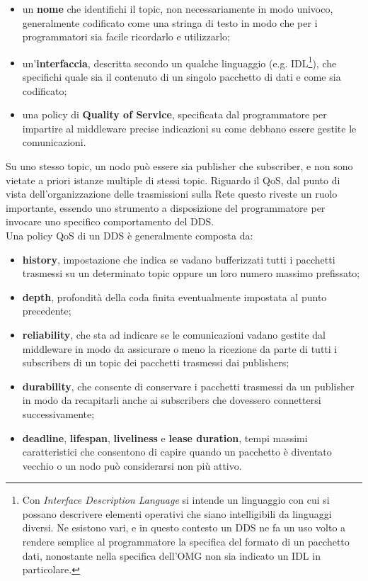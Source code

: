 \begin{itemize}
    \item un \textbf{nome} che identifichi il topic, non necessariamente in modo univoco, generalmente codificato come una stringa di testo in modo che per i programmatori sia facile ricordarlo e utilizzarlo;
    \item un'\textbf{interfaccia}, descritta secondo un qualche linguaggio (e.g. IDL\footnote{Con \emph{Interface Description Language} si intende un linguaggio con cui si possano descrivere elementi operativi che siano intelligibili da linguaggi diversi. Ne esistono vari, e in questo contesto un DDS ne fa un uso volto a rendere semplice al programmatore la specifica del formato di un pacchetto dati, nonostante nella specifica dell'OMG non sia indicato un IDL in particolare.}), che specifichi quale sia il contenuto di un singolo pacchetto di dati e come sia codificato;
    \item una policy di \textbf{Quality of Service}, specificata dal programmatore per impartire al middleware precise indicazioni su come debbano essere gestite le comunicazioni.
\end{itemize}
Su uno stesso topic, un nodo può essere sia publisher che subscriber, e non sono vietate a priori istanze multiple di stessi topic. Riguardo il QoS, dal punto di vista dell'organizzazione delle trasmissioni sulla Rete questo riveste un ruolo importante, essendo uno strumento a disposizione del programmatore per invocare uno specifico comportamento del DDS.\\
Una policy QoS di un DDS è generalmente composta da:
\begin{itemize}
    \item \textbf{history}, impostazione che indica se vadano bufferizzati tutti i pacchetti trasmessi su un determinato topic oppure un loro numero massimo prefissato;
    \item \textbf{depth}, profondità della coda finita eventualmente impostata al punto precedente;
    \item \textbf{reliability}, che sta ad indicare se le comunicazioni vadano gestite dal middleware in modo da assicurare o meno la ricezione da parte di tutti i subscribers di un topic dei pacchetti trasmessi dai publishers;
    \item \textbf{durability}, che consente di conservare i pacchetti trasmessi da un publisher in modo da recapitarli anche ai subscribers che dovessero connettersi successivamente;
    \item \textbf{deadline}, \textbf{lifespan}, \textbf{liveliness} e \textbf{lease duration}, tempi massimi caratteristici che consentono di capire quando un pacchetto è diventato vecchio o un nodo può considerarsi non più attivo.
\end{itemize}
